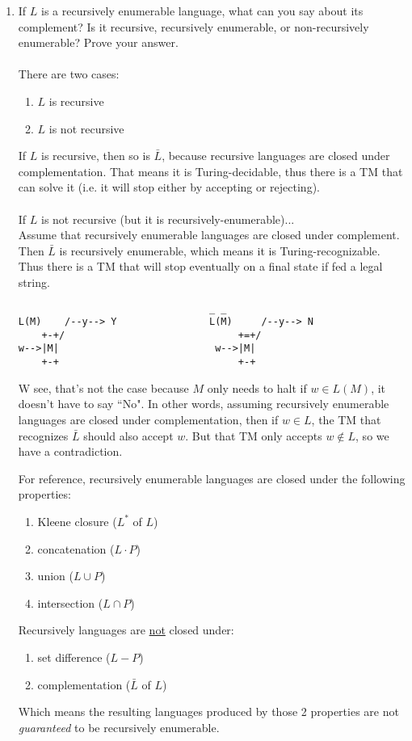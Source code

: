 \documentclass[10pt,a4paper,final]{article}
\begin{document}
\begin{enumerate}
\item %
If $L$ is a recursively enumerable language, what can you say about its complement?
Is it recursive, recursively enumerable, or non-recursively enumerable? Prove your answer. \\
\\
There are two cases:
\begin{enumerate}
  \item $L$ is recursive
  \item $L$ is not recursive
\end{enumerate}
If $L$ is recursive, then so is $\bar{L}$, because recursive languages are closed under complementation.
That means it is Turing-decidable, thus there is a TM that can solve it
(i.e. it will stop either by accepting or rejecting). \\
\\
If $L$ is not recursive (but it is recursively-enumerable)...\\
Assume that recursively enumerable languages are closed under complement.
Then $\bar{L}$ is recursively enumerable, which means it is Turing-recognizable.
Thus there is a TM that will stop eventually on a final state if fed a legal string. 

\begin{verbatim}
                                 _ _
L(M)    /--y--> Y                L(M)     /--y--> N
    +-+/                              +=+/
w-->|M|                           w-->|M|
    +-+                               +-+
\end{verbatim}
W see, that's not the case because $M$ only needs to halt if $w \in L(M)$, it doesn't have
to say ``No".
In other words, assuming recursively enumerable languages are closed under complementation,
then if $w \in L$, the TM that recognizes $\bar{L}$ should also accept $w$. But that TM
only accepts $w \notin L$, so we have a contradiction.

For reference, recursively enumerable languages are closed under the following properties:
\begin{enumerate}
  \item Kleene closure ($L^*$ of $L$)
  \item concatenation ($L \cdot P$)
  \item union ($L \cup P$)
  \item intersection ($L \cap P$)
\end{enumerate}
Recursively languages are \underline{not} closed under:
\begin{enumerate}
  \item set difference ($L - P$)
  \item complementation ($\bar{L}$ of $L$)
\end{enumerate}
Which means the resulting languages produced by those 2 properties are not \emph{guaranteed} to be
recursively enumerable.


\end{enumerate}
\end{document}
